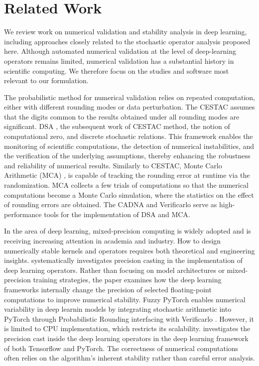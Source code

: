 \documentclass[manuscript, screen]{acmart}
\begin{document}
\section{Related Work}\label{sec:related_work}
We review work on numerical validation and stability analysis in deep learning, including approaches closely related to the stochastic operator analysis proposed here. Although automated numerical validation at the level of deep-learning operators remains limited, numerical validation has a substantial history in scientific computing. We therefore focus on the studies and software most relevant to our formulation.



The probabilistic method  for numerical validation relies on repeated computation, either with different rounding modes or data perturbation. The CESTAC assumes that the digits common to the results obtained under all rounding modes are significant. DSA \citep{Vignes2004}, the subsequent work of CESTAC method, the notion of computational zero, and discrete stochastic relations. This framework enables the monitoring of scientific computations, the detection of numerical instabilities, and the verification of the underlying assumptions, thereby enhancing the robustness and reliability of numerical results.  Similarly to CESTAC, Monte Carlo Arithmetic (MCA) \citep{852391}, is capable of tracking the rounding error at runtime via the randomization. MCA collects a few trials of computations so that the numerical computations become a Monte Carlo simulation, where the statistics on the effect of rounding errors are obtained. The CADNA \citep{Jez2008} and Verificarlo \citep{DBLP:journals/corr/DenisCP15} serve as high-performance tools for the implementation of  DSA  and MCA. 


In the area of deep learning, mixed-precision computing \citep{micikevicius2018mixed} is widely adopted and is receiving increasing attention in academia and industry. How to design numerically stable kernels and operators requires both theoretical and engineering insights. \cite{10.1145/3773992} systematically investigates precision casting in the implementation of deep learning operators. Rather than focusing on model architectures or mixed-precision training strategies, the paper examines how the deep learning  frameworks internally change the precision of selected floating-point computations to improve numerical stability. Fuzzy PyTorch \cite{pepe2026fuzzy} enables numerical variability in deep learnin models by integrating stochastic arithmetic into PyTorch through Probabilistic Rounding interfacing with Verificarlo \cite{DBLP:journals/corr/DenisCP15}.  However, it is limited to CPU implementation, which restricts its scalability. \cite{10.1145/3773992} investigates the precision cast inside the deep learning operators in the deep learning  framework of both Tensorflow and PyTorch.  The correctness of numerical computations often relies on the algorithm's inherent stability rather than careful error analysis. 
\end{document}
